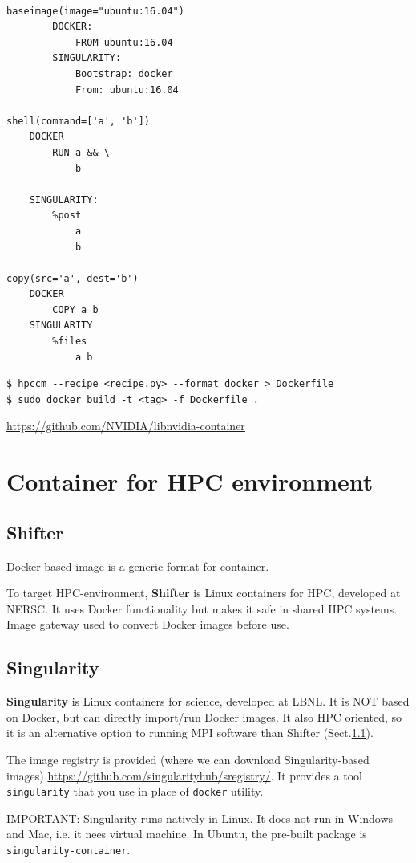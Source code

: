 \begin{verbatim}

baseimage(image="ubuntu:16.04")  
		DOCKER: 
			FROM ubuntu:16.04
		SINGULARITY:
			Bootstrap: docker
			From: ubuntu:16.04

shell(command=['a', 'b'])
	DOCKER
		RUN a && \
		    b 

	SINGULARITY:
		%post 
		    a
		    b
		    
copy(src='a', dest='b')
	DOCKER
		COPY a b
	SINGULARITY
		%files
			a b
\end{verbatim}

\begin{verbatim}
$ hpccm --recipe <recipe.py> --format docker > Dockerfile
$ sudo docker build -t <tag> -f Dockerfile .
\end{verbatim}
\url{https://github.com/NVIDIA/libnvidia-container}

\section{Container for HPC environment}

\subsection{Shifter}
\label{sec:Shifter}

Docker-based image is a generic format for container.

To target HPC-environment, {\bf Shifter} is Linux containers for HPC, developed
at NERSC. It uses Docker functionality but makes it safe in shared HPC systems.
Image gateway used to convert Docker images before use.


\subsection{Singularity}
\label{sec:Singularity}

{\bf Singularity} is Linux containers for science, developed at LBNL.
It is NOT based on Docker, but can directly import/run Docker images.
It also HPC oriented, so it is an alternative option to running MPI software
than Shifter (Sect.\ref{sec:Shifter}).

The image registry is provided (where we can download Singularity-based images)
\url{https://github.com/singularityhub/sregistry/}.
It provides a tool \verb!singularity! that you use in place of \verb!docker!
utility.

IMPORTANT: Singularity runs natively in Linux. It does not run in Windows and
Mac, i.e. it nees virtual machine. In Ubuntu, the pre-built package is 
\verb!singularity-container!. 

